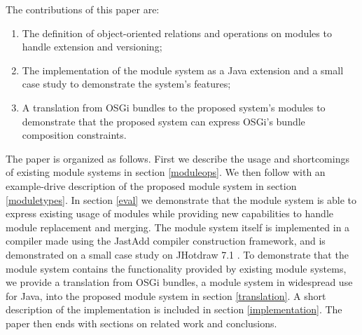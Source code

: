 




%

The contributions of this paper are:

\begin{enumerate}
\item  The definition of object-oriented relations and operations on modules to 
handle extension and versioning;
\item The implementation of the module system as a Java extension and a
small case study to demonstrate the system's features;
\item A translation from OSGi bundles to the proposed system's modules to
demonstrate that the proposed system can express OSGi's bundle composition constraints.
\end{enumerate}

The paper is organized as follows. First we describe the
usage and shortcomings of existing module systems in section \ref{moduleops}. 
We then follow with an example-drive description of the proposed module system in section \ref{moduletypes}. 
In section \ref{eval} we demonstrate that the module
system is able to express existing usage of modules while providing new
capabilities to handle module replacement and merging. The module system
itself is implemented in a compiler made using the JastAdd\cite{jastadd} compiler construction
framework, and is demonstrated on a small case study on JHotdraw 7.1 \cite{jhotdraw}.
To demonstrate that the module system contains the functionality provided by existing
module systems, we provide a translation from OSGi bundles, a module system in widespread
use for Java, into the proposed module system in section \ref{translation}.
A short description of the implementation is included in section \ref{implementation}.
The paper then ends with sections on related work and conclusions.
